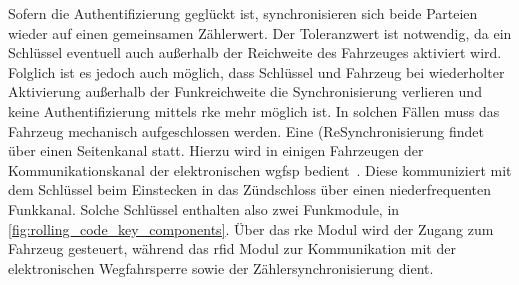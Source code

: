 Sofern die Authentifizierung geglückt ist, synchronisieren sich beide Parteien wieder auf einen gemeinsamen Zählerwert. Der Toleranzwert ist notwendig, da ein Schlüssel eventuell auch außerhalb der Reichweite des Fahrzeuges aktiviert wird. Folglich ist es jedoch auch möglich, dass Schlüssel und Fahrzeug bei wiederholter Aktivierung außerhalb der Funkreichweite die Synchronisierung verlieren und keine Authentifizierung mittels \gls{rke} mehr möglich ist. In solchen Fällen muss das Fahrzeug mechanisch aufgeschlossen werden. Eine (Re\discretionary{-)}{}{)}Synchronisierung findet über einen Seitenkanal statt. Hierzu wird in einigen Fahrzeugen der Kommunikationskanal der elektronischen \gls{wgfsp} bedient~\cite{Garcia2016}. Diese kommuniziert mit dem Schlüssel beim Einstecken in das Zündschloss über einen niederfrequenten Funkkanal. Solche Schlüssel enthalten also zwei Funkmodule, in \cref{fig:rolling_code_key_components}. Über das \gls{rke} Modul wird der Zugang zum Fahrzeug gesteuert, während das \gls{rfid} Modul zur Kommunikation mit der elektronischen Wegfahrsperre sowie der Zählersynchronisierung dient. %

